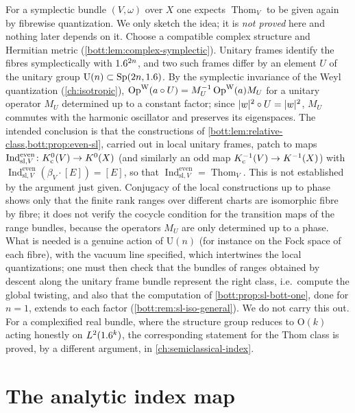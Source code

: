 \begin{remark}\label{bott:rem:thom-quantization}
  For a symplectic bundle $(V,\omega)$ over $X$ one expects $\operatorname{Thom}_V$ to be
  given again by fibrewise quantization. We only sketch the idea; it is \emph{not proved}
  here and nothing later depends on it. Choose a compatible complex structure and Hermitian metric
  (\cref{bott:lem:complex-symplectic}). Unitary frames identify the fibres symplectically with
  $1.6^{2n}$, and two such frames differ by an element $U$ of the unitary group
  $\mathrm U(n)\subset\mathrm{Sp}(2n,1.6)$. By the symplectic invariance of the Weyl
  quantization (\cref{ch:isotropic}), $\operatorname{Op}^{\mathrm{W}}(a\circ U)=M_U^{-1}\operatorname{Op}^{\mathrm{W}}(a)M_U$ for a unitary
  operator $M_U$ determined up to a constant factor; since $\lvert w\rvert^2\circ U=\lvert w\rvert^2$, $M_U$
  commutes with the harmonic oscillator and preserves its eigenspaces. The intended
  conclusion is that the constructions of \cref{bott:lem:relative-class,bott:prop:even-sl},
  carried out in local unitary frames, patch to maps
  $\operatorname{Ind}^{\mathrm{even}}_{\mathrm{sl},V}\colon K_{\mathrm{c}}^0(V)\to K^0(X)$ (and similarly an odd map
  $K_{\mathrm{c}}^{-1}(V)\to K^{-1}(X)$) with $\operatorname{Ind}^{\mathrm{even}}_{\mathrm{sl},V}(\beta_V\cdot[E])=[E]$, so that
  $\operatorname{Ind}^{\mathrm{even}}_{\mathrm{sl},V}=\operatorname{Thom}_V$. This is not
  established by the argument just given. Conjugacy of the local constructions up to phase
  shows only that the finite rank ranges over different charts are isomorphic fibre by
  fibre; it does not verify the cocycle condition for the transition maps of the range
  bundles, because the operators $M_U$ are only determined up to a phase. What is needed
  is a genuine action of $\mathrm U(n)$ (for instance on the Fock space of each fibre),
  with the vacuum line specified, which intertwines the local quantizations; one must then
  check that the bundles of ranges obtained by descent along the unitary frame bundle
  represent the right class, i.e.\ compute the global twisting, and also that the
  computation of \cref{bott:prop:sl-bott-one}, done for $n=1$, extends to each factor
  (\cref{bott:rem:sl-iso-general}). We do not carry this out. For a complexified real bundle,
  where the structure group reduces to $\mathrm O(k)$ acting honestly on $L^2(1.6^k)$, the
  corresponding statement for the Thom class is proved, by a different argument, in
  \cref{ch:semiclassical-index}.
\end{remark}

\section{The analytic index map}\label{bott:sec:analytic-index}

